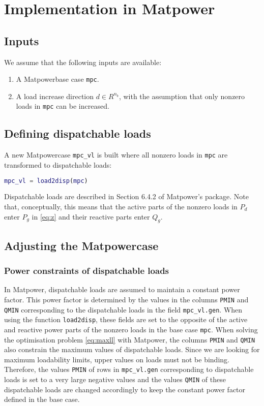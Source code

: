 \documentclass[12pt,a4]{article}
\newcommand*{\codemat}[1]{\texttt{#1}}
\newcommand*{\matpower}{{\sc Matpower}}
\begin{document}
\section{Implementation in \matpower{}}
\label{sec:impl-matp}

\subsection{Inputs}
\label{sec:inputs}

We assume that the following inputs are available:
\begin{enumerate}
\item A \matpower base case \codemat{mpc}.
\item A load increase direction $d \in R^{n_b}$, with the assumption that only nonzero loads in \codemat{mpc} can be increased.
\end{enumerate}

\subsection{Defining dispatchable loads}
\label{sec:defin-disp-loads}

A new \matpower case \codemat{mpc\_vl} is built where all nonzero loads in \codemat{mpc} are transformed to dispatchable loads:
\begin{lstlisting}[language=Matlab]
mpc_vl = load2disp(mpc)  
\end{lstlisting}
Dispatchable loads are described in Section 6.4.2 of \matpower's package.
Note that, conceptually, this means that the active parts of the nonzero loads in $P_d$ enter $P_g$ in \eqref{eq:z} and their reactive parts enter $Q_g$.

\subsection{Adjusting the \matpower case}
\label{sec:adjust-matp-case}

\subsubsection{Power constraints of dispatchable loads}
\label{sec:limits-disp-loads}

In \matpower, dispatchable loads are assumed to maintain a constant power factor. 
This power factor is determined by the values in the columns \codemat{PMIN} and \codemat{QMIN} corresponding to the dispatchable loads in the field \codemat{mpc\_vl.gen}.
When using the function \codemat{load2disp}, these fields are set to the opposite of the active and reactive power parts of the nonzero loads in the base case \codemat{mpc}.
When solving the optimisation problem \eqref{eq:maxll} with \matpower, the columns \codemat{PMIN} and \codemat{QMIN} also constrain the maximum values of dispatchable loads.
Since we are looking for maximum loadability limits, upper values on loads must not be binding.
Therefore, the values \codemat{PMIN} of rows in \codemat{mpc\_vl.gen} corresponding to dispatchable loads is set to a very large negative values and the values \codemat{QMIN} of these dispatchable loads are changed accordingly to keep the constant power factor defined in the base case.
\end{document}
